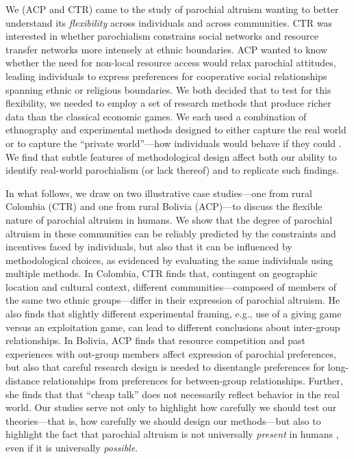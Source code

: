 \documentclass[bibauthoryear]{aa}
\begin{document}
We (ACP and CTR) came to the study of parochial altruism wanting to better understand its \textit{flexibility} across individuals and across communities. CTR was interested in whether parochialism constrains social networks and resource transfer networks more intensely at ethnic boundaries. ACP wanted to know whether the need for non-local resource access would relax parochial attitudes, leading individuals to express preferences for cooperative social relationships spanning ethnic or religious boundaries. We both decided that to test for this flexibility, we needed  to employ a set of research methods that produce richer data than the classical economic games. We each used a combination of ethnography and experimental %
 methods designed to either capture the real world  or to capture the ``private world''---how individuals would behave if they could \citep{Pisor2020}. We find that subtle features of methodological design affect both our ability to identify real-world parochialism (or lack thereof) and to replicate such findings. 

In what follows, we draw on two illustrative case studies---one from rural Colombia (CTR) and one from rural Bolivia (ACP)---to discuss the flexible nature of parochial altruism in humans. We show that the degree of parochial altruism in these communities can be reliably predicted by the constraints and incentives faced by individuals, but also that it can be influenced by methodological choices, as evidenced by evaluating the same individuals using multiple methods. In Colombia, CTR finds that, contingent on  geographic location and cultural context, different communities---composed of members of the same two ethnic groups---differ in their expression of parochial altruism. He also finds that slightly different experimental framing, e.g., use of a giving game versus an exploitation game, can lead to different conclusions about inter-group relationships. In Bolivia, ACP finds that resource competition and past experiences with out-group members affect expression of parochial preferences, but also that careful research design is needed to disentangle preferences for long-distance relationships from preferences for between-group relationships. Further, she finds that that ``cheap talk'' does not necessarily reflect behavior in the real world. Our studies serve not only to highlight how carefully we should test our theories---that is, how carefully we should design our methods---but also to highlight the fact that parochial altruism is not universally \textit{present} in humans \citep[e.g.,][] {brewer1976ethnocentrism}, even if it is universally \textit{possible}.
\end{document}
